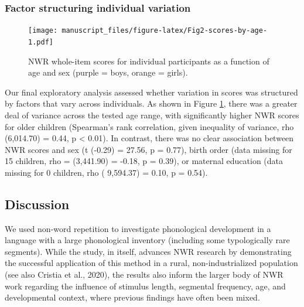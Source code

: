 \documentclass[english,,man,floatsintext]{apa6}
\begin{document}
\hypertarget{factor-structuring-individual-variation}{%
\subsubsection{Factor structuring individual variation}\label{factor-structuring-individual-variation}}

\begin{figure}
\centering
\texttt{[image: manuscript\_files/figure-latex/Fig2-scores-by-age-1.pdf]}
\caption{\label{fig:Fig2-scores-by-age}NWR whole-item scores for individual participants as a function of age and sex (purple = boys, orange = girls).}
\end{figure}

Our final exploratory analysis assessed whether variation in scores was structured by factors that vary across individuals. As shown in Figure \ref{fig:Fig2-scores-by-age}, there was a greater deal of variance across the tested age range, with significantly higher NWR scores for older children (Spearman's rank correlation, given inequality of variance, rho (6,014.70) = 0.44, p \textless{} 0.01). In contrast, there was no clear association between NWR scores and sex (t (-0.29) = 27.56, p = 0.77), birth order (data missing for 15 children, rho = (3,441.90) = -0.18, p = 0.39), or maternal education (data missing for 0 children, rho ( 9,594.37) = 0.10, p = 0.54).

\hypertarget{discussion}{%
\subsection{Discussion}\label{discussion}}

We used non-word repetition to investigate phonological development in a language with a large phonological inventory (including some typologically rare segments). While the study, in itself, advances NWR research by demonstrating the successful application of this method in a rural, non-industrialized population (see also Cristia et al., 2020), the results also inform the larger body of NWR work regarding the influence of stimulus length, segmental frequency, age, and developmental context, where previous findings have often been mixed.
\end{document}
